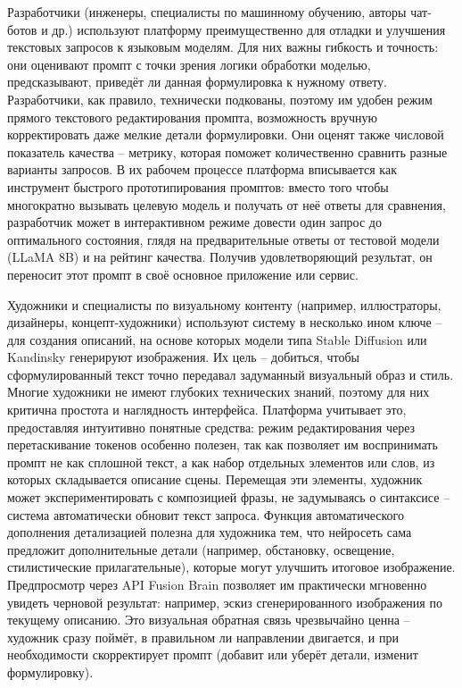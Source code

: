 Разработчики (инженеры, специалисты по машинному обучению, авторы чат-ботов и др.) используют платформу преимущественно для отладки и улучшения текстовых запросов к языковым моделям. Для них важны гибкость и точность: они оценивают промпт с точки зрения логики обработки моделью, предсказывают, приведёт ли данная формулировка к нужному ответу. Разработчики, как правило, технически подкованы, поэтому им удобен режим прямого текстового редактирования промпта, возможность вручную корректировать даже мелкие детали формулировки. Они оценят также числовой показатель качества – метрику, которая поможет количественно сравнить разные варианты запросов. В их рабочем процессе платформа вписывается как инструмент быстрого прототипирования промптов: вместо того чтобы многократно вызывать целевую модель и получать от неё ответы для сравнения, разработчик может в интерактивном режиме довести один запрос до оптимального состояния, глядя на предварительные ответы от тестовой модели (LLaMA 8B) и на рейтинг качества. Получив удовлетворяющий результат, он переносит этот промпт в своё основное приложение или сервис.

Художники и специалисты по визуальному контенту (например, иллюстраторы, дизайнеры, концепт-художники) используют систему в несколько ином ключе – для создания описаний, на основе которых модели типа Stable Diffusion или Kandinsky генерируют изображения. Их цель – добиться, чтобы сформулированный текст точно передавал задуманный визуальный образ и стиль. Многие художники не имеют глубоких технических знаний, поэтому для них критична простота и наглядность интерфейса. Платформа учитывает это, предоставляя интуитивно понятные средства: режим редактирования через перетаскивание токенов особенно полезен, так как позволяет им воспринимать промпт не как сплошной текст, а как набор отдельных элементов или слов, из которых складывается описание сцены. Перемещая эти элементы, художник может экспериментировать с композицией фразы, не задумываясь о синтаксисе – система автоматически обновит текст запроса. Функция автоматического дополнения детализацией полезна для художника тем, что нейросеть сама предложит дополнительные детали (например, обстановку, освещение, стилистические прилагательные), которые могут улучшить итоговое изображение. Предпросмотр через API Fusion Brain позволяет им практически мгновенно увидеть черновой результат: например, эскиз сгенерированного изображения по текущему описанию. Это визуальная обратная связь чрезвычайно ценна – художник сразу поймёт, в правильном ли направлении двигается, и при необходимости скорректирует промпт (добавит или уберёт детали, изменит формулировку).

